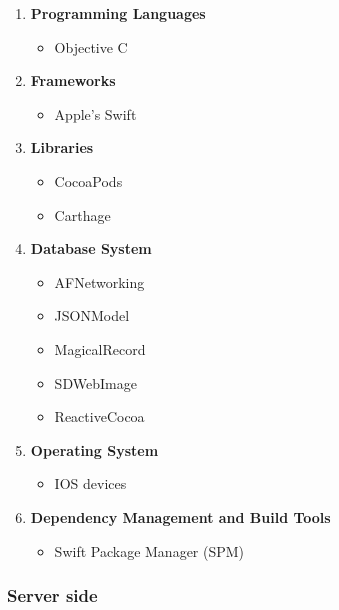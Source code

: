 \documentclass{article}
\begin{document}
			\begin{enumerate}
			 \item \textbf{Programming Languages}
				\begin{itemize}
					\item Objective C
				\end{itemize}
			\item \textbf{Frameworks}
				\begin{itemize}
					\item Apple's Swift
				\end{itemize}
			\item \textbf{Libraries}
				\begin{itemize}
					\item CocoaPods
					\item Carthage
				\end{itemize}
			\item \textbf{Database System}
				\begin{itemize}
	 				\item AFNetworking
					\item JSONModel
					\item MagicalRecord
					\item SDWebImage
					\item ReactiveCocoa
				\end{itemize}
			\item \textbf{Operating System}
				\begin{itemize}
	 				\item IOS devices
				\end{itemize}
			\item \textbf{Dependency Management and Build Tools}
				\begin{itemize}
					\item Swift Package Manager (SPM)
				\end{itemize}
			\end{enumerate}
	
		\subsubsection{Server side}
		
\end{document}
